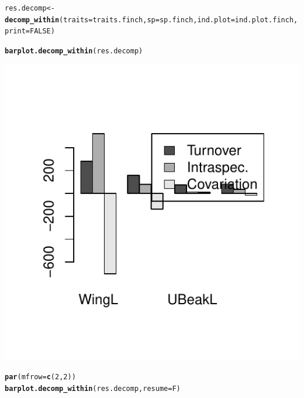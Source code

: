 \documentclass[12pt]{article}\usepackage[]{graphicx}\usepackage[]{color}
\makeatletter
\def\maxwidth{ %
  \ifdim\Gin@nat@width>\linewidth
    \linewidth
  \else
    \Gin@nat@width
  \fi
}
\newcommand{\hlnum}[1]{\textcolor[rgb]{0.686,0.059,0.569}{#1}}%
\newcommand{\hlstd}[1]{\textcolor[rgb]{0.345,0.345,0.345}{#1}}%
\newcommand{\hlkwb}[1]{\textcolor[rgb]{0.69,0.353,0.396}{#1}}%
\newcommand{\hlkwc}[1]{\textcolor[rgb]{0.333,0.667,0.333}{#1}}%
\newcommand{\hlkwd}[1]{\textcolor[rgb]{0.737,0.353,0.396}{\textbf{#1}}}%
\newenvironment{kframe}{%
 \def\at@end@of@kframe{}%
 \ifinner\ifhmode%
  \def\at@end@of@kframe{\end{minipage}}%
  \begin{minipage}{\columnwidth}%
 \fi\fi%
 \def\FrameCommand##1{\hskip\@totalleftmargin \hskip-\fboxsep
 \colorbox{shadecolor}{##1}\hskip-\fboxsep
     \hskip-\linewidth \hskip-\@totalleftmargin \hskip\columnwidth}%
 \MakeFramed {\advance\hsize-\width
   \@totalleftmargin\z@ \linewidth\hsize
   \@setminipage}}%
 {\par\unskip\endMakeFramed%
 \at@end@of@kframe}
\newenvironment{knitrout}{}{} %
\makeatother
\begin{document}
\begin{knitrout}
\color{fgcolor}\begin{kframe}
\begin{alltt}
\hlstd{res.decomp} \hlkwb{<-} \hlkwd{decomp_within}\hlstd{(}\hlkwc{traits} \hlstd{= traits.finch,} \hlkwc{sp} \hlstd{= sp.finch,} \hlkwc{ind.plot} \hlstd{= ind.plot.finch,}
    \hlkwc{print} \hlstd{=} \hlnum{FALSE}\hlstd{)}

\hlkwd{barplot.decomp_within}\hlstd{(res.decomp)}
\end{alltt}
\end{kframe}

{\centering \includegraphics[width=\maxwidth]{figure/unnamed-chunk-141} 

}


\begin{kframe}\begin{alltt}
\hlkwd{par}\hlstd{(}\hlkwc{mfrow} \hlstd{=} \hlkwd{c}\hlstd{(}\hlnum{2}\hlstd{,} \hlnum{2}\hlstd{))}
\hlkwd{barplot.decomp_within}\hlstd{(res.decomp,} \hlkwc{resume} \hlstd{= F)}
\end{alltt}
\end{kframe}


\end{knitrout}
\end{document}
